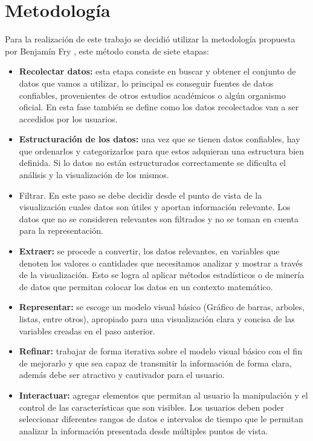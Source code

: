 \documentclass{article}
\begin{document}
\section{Metodología }
Para la realización de este trabajo se decidió utilizar la metodología propuesta por Benjamín Fry \cite{fry2008visualizing}, este método consta de siete etapas:
\begin{itemize}
    \item \textbf{Recolectar datos:} esta etapa consiste en buscar y obtener el conjunto de datos que vamos a utilizar, lo principal es conseguir fuentes de datos confiables, provenientes de otros estudios académicos o algún organismo oficial. En esta fase también se define como los datos recolectados van a ser accedidos por los usuarios.
    \item \textbf{Estructuración de los datos:} una vez que se tienen datos confiables, hay que ordenarlos y categorizarlos para que estos adquieran una estructura bien definida. Si lo datos no están estructurados correctamente se dificulta el análisis y la visualización de los mismos.
    \item Filtrar.
    En este paso se debe decidir desde el punto de vista de la visualización cuales datos son útiles y aportan información relevante. Los datos que no se consideren relevantes son filtrados y no se toman en cuenta para la representación.
    \item \textbf{Extraer: }
    se procede a convertir, los datos relevantes, en variables que denoten los valores o cantidades que necesitamos analizar y mostrar a través de la visualización. Esto se logra al aplicar métodos estadísticos o de minería de datos que permitan colocar los datos en un contexto matemático.
    \item \textbf{Representar:}
    se escoge un modelo visual básico (Gráfico de barras, arboles, listas, entre otros), apropiado para una visualización clara y concisa de las variables creadas en el paso anterior.
    \item \textbf{Refinar: }
    trabajar de forma iterativa sobre el modelo visual básico con el fin de mejorarlo y que sea capaz de transmitir la información de forma clara, además debe ser atractivo y cautivador para el usuario.  
    \item \textbf{Interactuar: }
    agregar elementos que permitan al usuario la manipulación y el control de las características que son visibles. Los usuarios deben poder seleccionar diferentes rangos de datos e intervalos de tiempo que le permitan analizar la información presentada desde múltiples puntos de vista.  
\end{itemize}
\end{document}
